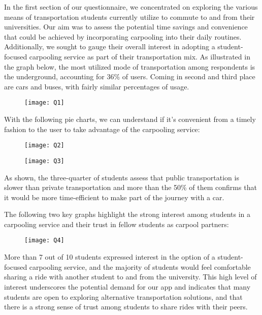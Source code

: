 \documentclass{article}
\begin{document}
In the first section of our questionnaire, we concentrated on exploring the various means of transportation students currently utilize to commute to and from their universities. Our aim was to assess the potential time savings and convenience that could be achieved by incorporating carpooling into their daily routines. Additionally, we sought to gauge their overall interest in adopting a student-focused carpooling service as part of their transportation mix. As illustrated in the graph below, the most utilized mode of transportation among respondents is the underground, accounting for 36\% of users. Coming in second and third place are cars and buses, with fairly similar percentages of usage. \newline 

\begin{figure}[htbp]
  \centering
     \texttt{[image: Q1]}
\end{figure}
\newpage

With the following pie charts, we can understand if it’s convenient from a timely fashion to the user to take advantage of the carpooling service: 

\begin{figure}[htbp]
  \centering
     \texttt{[image: Q2]}
\end{figure}
\begin{figure}[htbp]
  \centering
     \texttt{[image: Q3]}
\end{figure}

As shown, the three-quarter of students assess that public transportation is slower than private transportation and more than the 50\% of them confirms that it would be more time-efficient to make part of the journey with a car. 
\newpage

The following two key graphs highlight the strong interest among students in a carpooling service and their trust in fellow students as carpool partners: 

\begin{figure}[htbp]
  \centering
     \texttt{[image: Q4]}
\end{figure}

More than 7 out of 10 students expressed interest in the option of a student-focused carpooling service, and the majority of students would feel comfortable sharing a ride with another student to and from the university. This high level of interest underscores the potential demand for our app and indicates that many students are open to exploring alternative transportation solutions, and that there is a strong sense of trust among students to share rides with their peers. \newpage 
\end{document}

